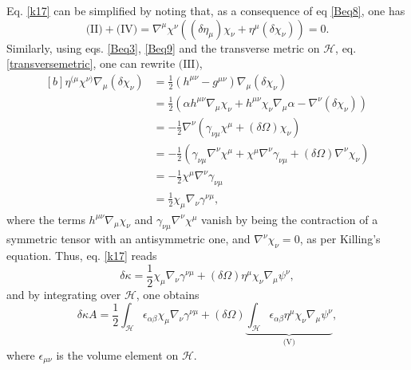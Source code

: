 \documentclass[
12pt,		%
openright,	%
twoside,  %
a4paper,			%
chapter=TITLE,		%
english,			%
french,				%
spanish,			%
brazil				%
]{USPSC-classe/USPSC}
\begin{document}
Eq. \ref{k17} can be simplified by noting that, as a consequence of eq \ref{Beq8}, one has
\begin{equation}
    \text{(II)}+\text{(IV)}=\nabla^{\mu}\chi^{\nu}((\delta\eta_{\mu})\chi_{\nu}+\eta^{\mu}(\delta\chi_{\nu}))=0.
\end{equation}
Similarly, using eqs. \ref{Beq3}, \ref{Beq9} and the transverse metric on $\mathscr{H}$, eq. \ref{transversemetric}, one can rewrite $\text{(III)}$, 
\begin{equation}
\begin{aligned}[b]
\eta^{(\mu}\chi^{\nu)}\nabla_{\mu}(\delta\chi_{\nu}) &= \frac{1}{2}(h^{\mu\nu}-g^{\mu\nu})\nabla_{\mu}(\delta\chi_{\nu})\\
& = \frac{1}{2}(\alpha h^{\mu\nu}\nabla_{\mu}\chi_{\nu}+h^{\mu\nu}\chi_{\nu}\nabla_{\mu}\alpha-\nabla^{\nu}(\delta\chi_{\nu}))\\
& = -\frac{1}{2}\nabla^{\nu}(\gamma_{\nu\mu}\chi^{\mu}+(\delta\Omega)\chi_{\nu})\\
& = -\frac{1}{2}(\gamma_{\nu\mu}\nabla^{\nu}\chi^{\mu}+\chi^{\mu}\nabla^{\nu}\gamma_{\nu\mu}+(\delta\Omega)\nabla^{\nu}\chi_{\nu})\\
& = -\frac{1}{2}\chi^{\mu}\nabla^{\nu}\gamma_{\nu\mu}\\
& = \frac{1}{2}\chi_{\mu}\nabla_{\nu}\gamma^{\nu\mu},
\end{aligned}    
\end{equation}
where the terms $h^{\mu\nu}\nabla_{\mu}\chi_{\nu}$ and $\gamma_{\nu\mu}\nabla^{\nu}\chi^{\mu}$ vanish by being the contraction of a symmetric tensor with an antisymmetric one, and $\nabla^{\nu}\chi_{\nu}=0$, as per Killing's equation. Thus, eq. \ref{k17} reads
\begin{equation}
    \delta\kappa=\frac{1}{2}\chi_{\mu}\nabla_{\nu}\gamma^{\nu\mu}+(\delta\Omega)\eta^{\mu}\chi_{\nu}\nabla_{\mu}\psi^{\nu},
\end{equation}
and by integrating over $\mathscr{H}$, one obtains
\begin{equation}\label{k18}
    \delta\kappa A=\frac{1}{2}\int_{\mathscr{H}}\epsilon_{\alpha\beta}\chi_{\mu}\nabla_{\nu}\gamma^{\nu\mu}+(\delta\Omega)\underbrace{\int_{\mathscr{H}}\epsilon_{\alpha\beta}\eta^{\mu}\chi_{\nu}\nabla_{\mu}\psi^{\nu}}_{\text{(V)}},
\end{equation}
where $\epsilon_{\mu\nu}$ is the volume element on $\mathscr{H}$. 
\end{document}

